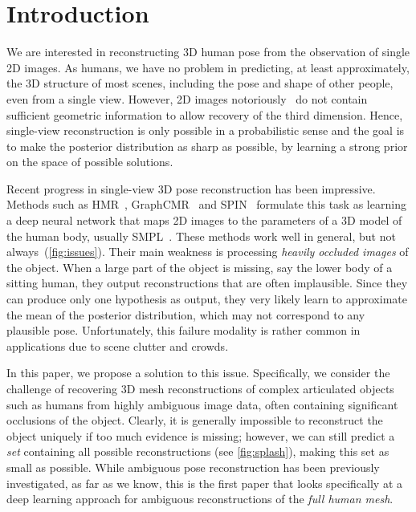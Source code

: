 \section{Introduction}\label{s:intro}

We are interested in reconstructing 3D human pose from the observation of single 2D images.
As humans, we have no problem in predicting, at least approximately, the 3D structure of most scenes, including the pose and shape of other people, even from a single view.
However, 2D images notoriously~\citep{Faugeras01geometry} do not contain sufficient geometric information to allow recovery of the third dimension.
Hence, single-view reconstruction is only possible in a probabilistic sense and the goal is to make the posterior distribution as sharp as possible, by learning a strong prior on the space of possible solutions.

Recent progress in single-view 3D pose reconstruction has been impressive.
Methods such as HMR~\citep{kanazawa18end-to-end}, GraphCMR~\citep{kolotouros19convolutional} and SPIN~\citep{kolotouros19learning} formulate this task as learning a deep neural network that maps 2D images to the parameters of a 3D model of the human body, usually SMPL~\cite{loper2015smpl}.
These methods work well in general, but not always~(\cref{fig:issues}).
Their main weakness is processing \emph{heavily occluded images} of the object.
When a large part of the object is missing, say the lower body of a sitting human, they output reconstructions that are often implausible.
Since they can produce only one hypothesis as output, they very likely learn to approximate the mean of the posterior distribution, which may not correspond to any plausible pose.
Unfortunately, this failure modality is rather common in applications due to scene clutter and crowds.

In this paper, we propose a solution to this issue.
Specifically, we consider the challenge of recovering 3D mesh reconstructions of complex articulated objects such as humans from highly ambiguous image data, often containing significant occlusions of the object.
Clearly, it is generally impossible to reconstruct the object uniquely if too much evidence is missing; however, we can still predict a \emph{set} containing all possible reconstructions (see \cref{fig:splash}), making this set as small as possible.
While ambiguous pose reconstruction has been previously investigated, as far as we know, this is the first paper that looks specifically at a deep learning approach for ambiguous reconstructions of the \emph{full human mesh}.

